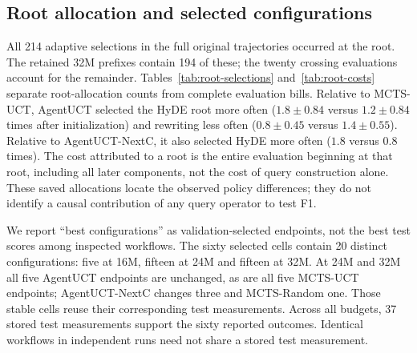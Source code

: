 

\subsection{Root allocation and selected configurations}
\label{sec:allocation-configurations}
All 214 adaptive selections in the full original trajectories occurred at
the root. The retained 32M prefixes contain 194 of these; the twenty crossing
evaluations account for the remainder. Tables~\ref{tab:root-selections}
and~\ref{tab:root-costs} separate root-allocation counts from complete evaluation
bills. Relative to MCTS-UCT, AgentUCT selected the HyDE root more often
($1.8\pm0.84$ versus $1.2\pm0.84$ times after initialization) and rewriting
less often ($0.8\pm0.45$ versus $1.4\pm0.55$). Relative to AgentUCT-NextC,
it also selected HyDE more often ($1.8$ versus $0.8$ times).
The cost attributed to a root is the entire evaluation beginning at that root,
including all later components, not the cost of query construction alone.
These saved allocations locate the observed policy differences; they do not
identify a causal contribution of any query operator to test F1.

\begin{table}[htbp]
\centering\small
\caption{Adaptive root selections in retained 32M prefixes, mean $\pm$
sample SD over five seeds. Common initialization and the crossing evaluation
are excluded. Subsequent expansion and rollout remained uniform.}
\label{tab:root-selections}

\end{table}
\begin{table}[htbp]
\centering\small
\caption{Retained 32M cost by initiating root action, in M weighted tokens
(mean $\pm$ sample SD). Each entry includes the entire evaluations in that
group, including initialization. These are not component-specific query costs.}
\label{tab:root-costs}

\end{table}

We report ``best configurations'' as validation-selected endpoints, not the
best test scores among inspected workflows. The sixty selected cells contain
20 distinct configurations: five at 16M, fifteen at 24M and fifteen at 32M.
At 24M and 32M all five AgentUCT endpoints are unchanged, as are all five MCTS-UCT
endpoints; AgentUCT-NextC changes three and MCTS-Random one. Those stable cells
reuse their corresponding test measurements. Across all budgets, 37 stored
test measurements support the sixty reported outcomes. Identical workflows in
independent runs need not share a stored test measurement.

